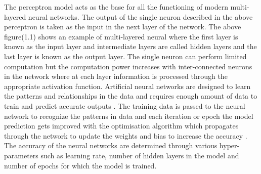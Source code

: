 The perceptron model acts as the base for all the functioning of modern multi-layered neural networks.
The output of the single neuron described in the above perceptron is taken as the input in the next layer of the network. The above figure(1.1) shows an example of multi-layered neural where the first layer is known 
as the input layer and intermediate layers are called hidden layers and the last layer is known as the output layer.
The single neuron can perform limited computation but the computation power increases with inter-connected
neurons in the network \citep{AGATONOVICKUSTRIN2000717} where at each layer information is processed through the appropriate activation function. Artificial neural networks are designed to learn the patterns and relationships in the data and requires enough amount of data to train and predict accurate outputs \citep{AGATONOVICKUSTRIN2000717}.
The training data is passed to the neural network to recognize the patterns in data and each iteration or epoch the model prediction gets improved with the optimisation algorithm which propagates through the network to 
update the weights and bias to increase the accuracy \citep{AGATONOVICKUSTRIN2000717}. The accuracy of the neural networks are determined through various hyper-parameters such as learning rate, number of hidden layers in the model and 
number of epochs for which the model is trained.


